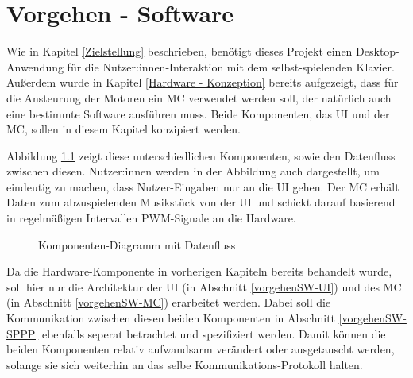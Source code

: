\nocite{*}
\chapter{Vorgehen - Software} \label{vorgehenSW}

Wie in Kapitel \ref{Zielstellung} beschrieben, benötigt dieses Projekt einen Desktop-Anwendung für die Nutzer:innen-Interaktion mit dem selbst-spielenden Klavier.
Außerdem wurde in Kapitel \ref{Hardware - Konzeption} bereits aufgezeigt, dass für die Ansteurung der Motoren ein \ac{MC} verwendet werden soll, der natürlich auch eine bestimmte Software ausführen muss.
Beide Komponenten, das \ac{UI} und der \ac{MC}, sollen in diesem Kapitel konzipiert werden.

Abbildung \ref*{fig:high-level-komponenten} zeigt diese unterschiedlichen Komponenten, sowie den Datenfluss zwischen diesen.
Nutzer:innen werden in der Abbildung auch dargestellt, um eindeutig zu machen, dass Nutzer-Eingaben nur an die \ac{UI} gehen.
Der \ac{MC} erhält Daten zum abzuspielenden Musikstück von der \ac{UI} und schickt darauf basierend in regelmäßigen Intervallen \ac{PWM}-Signale an die Hardware.

\begin{figure}[htbp]
    \centering
    \caption{Komponenten-Diagramm mit Datenfluss}
    \label{fig:high-level-komponenten}
\end{figure}

Da die Hardware-Komponente in vorherigen Kapiteln bereits behandelt wurde, soll hier nur die Architektur der \ac{UI} (in Abschnitt \ref{vorgehenSW-UI}) und des \ac{MC} (in Abschnitt \ref{vorgehenSW-MC}) erarbeitet werden.
Dabei soll die Kommunikation zwischen diesen beiden Komponenten in Abschnitt \ref{vorgehenSW-SPPP} ebenfalls seperat betrachtet und spezifiziert werden.
Damit können die beiden Komponenten relativ aufwandsarm verändert oder ausgetauscht werden, solange sie sich weiterhin an das selbe Kommunikations-Protokoll halten.

